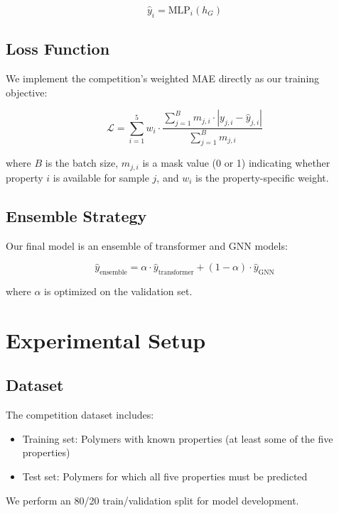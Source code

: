 \documentclass[10pt,twocolumn,letterpaper]{article}
\begin{document}
\begin{equation}
\hat{y}_i = \text{MLP}_i(h_G)
\end{equation}

\subsection{Loss Function}

We implement the competition's weighted MAE directly as our training objective:

\begin{equation}
\mathcal{L} = \sum_{i=1}^5 w_i \cdot \frac{\sum_{j=1}^B m_{j,i} \cdot |y_{j,i} - \hat{y}_{j,i}|}{\sum_{j=1}^B m_{j,i}}
\end{equation}

where $B$ is the batch size, $m_{j,i}$ is a mask value (0 or 1) indicating whether property $i$ is available for sample $j$, and $w_i$ is the property-specific weight.

\subsection{Ensemble Strategy}

Our final model is an ensemble of transformer and GNN models:

\begin{equation}
\hat{y}_{\text{ensemble}} = \alpha \cdot \hat{y}_{\text{transformer}} + (1 - \alpha) \cdot \hat{y}_{\text{GNN}}
\end{equation}

where $\alpha$ is optimized on the validation set.

\section{Experimental Setup}

\subsection{Dataset}

The competition dataset includes:
\begin{itemize}
    \item Training set: Polymers with known properties (at least some of the five properties)
    \item Test set: Polymers for which all five properties must be predicted
\end{itemize}

We perform an 80/20 train/validation split for model development.
\end{document}
